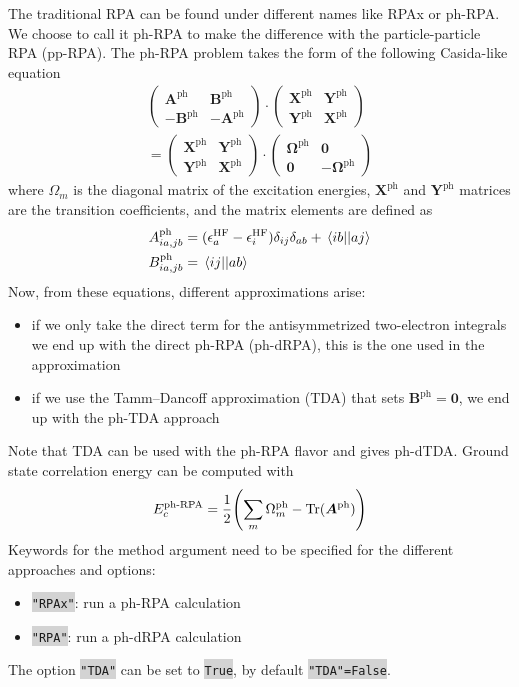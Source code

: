 \documentclass[aip,jcp,reprint,noshowkeys,superscriptaddress]{revtex4-1}
\newcommand{\GW}{\text{$GW$}}
\newcommand{\HF}{\text{HF}}
\newcommand{\ph}{\text{ph}}
\newcommand{\ep}{\epsilon}
\newcommand{\bO}{\mathbf{0}}
\newcommand{\bX}{\bm{X}}
\newcommand{\bY}{\bm{Y}}
\newcommand{\bA}{\mathbf{A}}
\newcommand{\bB}{\mathbf{B}}
\newcommand{\bOme}{\boldsymbol{\Omega}}
\newcommand{\Mat}[2]{\bm{#1}^{\text{#2}}}
\newcommand{\keyword}[1]{{\colorbox{lightgray}{\texttt{#1}}}}
\begin{document}
The traditional RPA can be found under different names like RPAx or ph-RPA. We choose to call it ph-RPA to make the difference with the particle-particle RPA (pp-RPA). The ph-RPA problem takes the form of the following Casida-like equation 
\begin{multline}
\label{eq:phRPA}
	\begin{pmatrix}
		\bA^{\ph} & \bB^{\ph} 
		\\
		- \bB^{\ph} &  -\bA^{\ph}
	\end{pmatrix}
	\cdot
	\begin{pmatrix}
		\bX^{\ph} & \bY^{\ph}
		\\
		\bY^{\ph} & \bX^{\ph}
	\end{pmatrix}
	\\
	=
	\begin{pmatrix}
		\bX^{\ph} & \bY^{\ph}
		\\
		\bY^{\ph} & \bX^{\ph}
	\end{pmatrix}
	\cdot
	\begin{pmatrix}
		\bOme^{\ph} & \bO
		\\
		\bO & -\bOme^{\ph}
	\end{pmatrix}
\end{multline} 
where $\Omega_m$ is the diagonal matrix of the excitation energies, $\bX^{\ph}$ and $\bY^{\ph}$ matrices are the transition coefficients, and the matrix elements are defined as 
\begin{align}
	A_{ia,jb}^\ph & = (\ep_{a}^{\HF} - \ep_{i}^{\HF}) \delta_{ij} \delta_{ab} + \mel{ib}{}{aj} 
	\\
	B_{ia,jb}^\ph & = \mel{ij}{}{ab} 
\end{align}
Now, from these equations, different approximations arise:
\begin{itemize}
\item if we only take the direct term for the antisymmetrized two-electron integrals we end up with the direct ph-RPA (ph-dRPA), this is the one used in the {\GW} approximation
\item if we use the Tamm–Dancoff approximation (TDA) that sets $\Mat{B}{ph}=\bm{0}$, we end up with the ph-TDA approach
\end{itemize}
Note that TDA can be used with the ph-RPA flavor and gives ph-dTDA. Ground state correlation energy can be computed with 
\begin{equation}
E_c^{\text{ph-RPA}}=\frac{1}{2} \qty(\sum_m \Omega_m^{\ph} - \text{Tr}(\bm{A}^{\ph})) 
\end{equation}
Keywords for the method argument need to be specified for the different approaches and options:
\begin{itemize}
\item \keyword{"RPAx"}: run a ph-RPA calculation
\item \keyword{"RPA"}: run a ph-dRPA calculation
\end{itemize}
The option \keyword{"TDA"} can be set to \keyword{True}, by default \keyword{"TDA"=False}.
\end{document}
